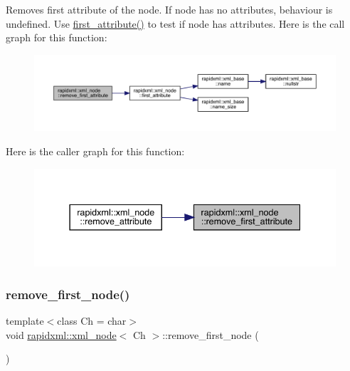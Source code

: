 Removes first attribute of the node. If node has no attributes, behaviour is undefined. Use \mbox{\hyperlink{classrapidxml_1_1xml__node_ab816ab6f13ee4b0588d5b76b0697511c}{first\+\_\+attribute()}} to test if node has attributes. Here is the call graph for this function\+:\nopagebreak
\begin{figure}[H]
\begin{center}
\leavevmode
\includegraphics[width=350pt]{classrapidxml_1_1xml__node_aa95192d2a165cca16c551ed2a2a06aec_cgraph}
\end{center}
\end{figure}
Here is the caller graph for this function\+:\nopagebreak
\begin{figure}[H]
\begin{center}
\leavevmode
\includegraphics[width=337pt]{classrapidxml_1_1xml__node_aa95192d2a165cca16c551ed2a2a06aec_icgraph}
\end{center}
\end{figure}
\mbox{\label{classrapidxml_1_1xml__node_a62bf7b276cf7a651a3337f5e0a0ef6ac}} 
\subsubsection{\texorpdfstring{remove\_first\_node()}{remove\_first\_node()}}
{\footnotesize\ttfamily template$<$class Ch = char$>$ \\
void \mbox{\hyperlink{classrapidxml_1_1xml__node}{rapidxml\+::xml\+\_\+node}}$<$ Ch $>$\+::remove\+\_\+first\+\_\+node (\begin{DoxyParamCaption}{ }\end{DoxyParamCaption})\hspace{0.3cm}{\ttfamily [inline]}}

